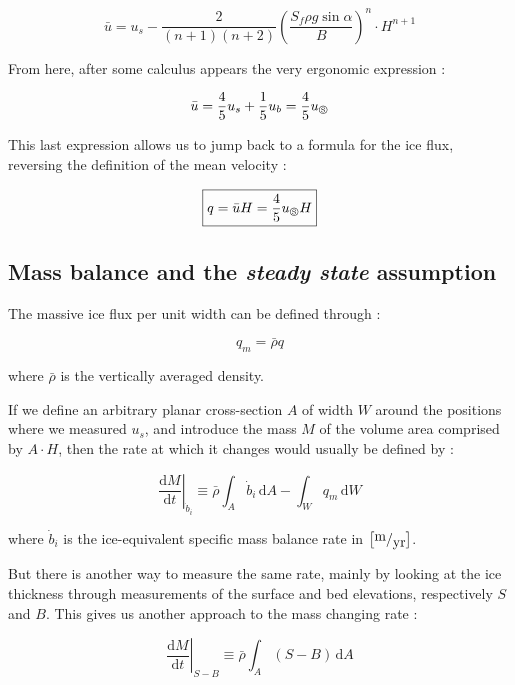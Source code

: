 \begin{equation}\bar{u} = u_s - \frac{2}{(n+1)(n+2)} \left( \frac{S_f \rho g \sin{\alpha}}{B}\right)^n \cdot H^{n+1}\end{equation}

From here, after some calculus appears the very ergonomic expression :

\begin{equation}\bar{u} = \frac{4}{5}u_s + \frac{1}{5}u_b = \frac{4}{5}u_\circledS\end{equation}

This last expression allows us to jump back to a formula for the ice flux, reversing the definition of the mean velocity :

\begin{equation}
\boxed{q = \bar{u}H = \frac{4}{5}u_\circledS H}
\end{equation}


\subsection*{Mass balance and the \textit{steady state} assumption}

The massive ice flux per unit width can be defined through :

\begin{equation}q_m = \bar{\rho}q\end{equation}

where $\bar{\rho}$ is the vertically averaged density.

If we define an arbitrary planar cross-section $A$ of width $W$ around the positions where we measured $u_s$, and introduce the mass $M$ of the volume area comprised by $A \cdot H$, then the rate at which it changes would usually be defined \cite{Cuffey2010} by :
 
\begin{equation}\left. \frac{\mathrm{d} M}{\mathrm{d}t} \right|_{\dot{b}_i} \equiv \bar{\rho} \int_A \dot{b}_i \, \mathrm{d}A - \int_W q_m \, \mathrm{d} W \end{equation}

where $\dot{b}_i$ is the ice-equivalent specific mass balance rate in $\left[ \fraction{m}{yr} \right]$.

But there is another way to measure the same rate, mainly by looking at the ice thickness through measurements of the surface and bed elevations, respectively $S$ and $B$. This gives us another approach to the mass changing rate :

\begin{equation}\left. \frac{\mathrm{d} M}{\mathrm{d}t} \right|_{S-B} \equiv \bar{\rho} \int_A (S-B) \, \mathrm{d}A\end{equation}

